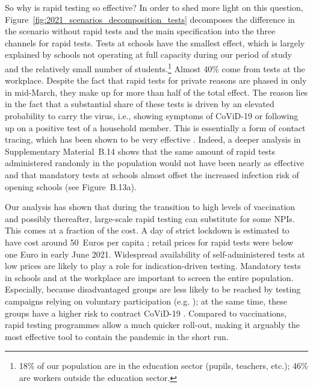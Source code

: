 \documentclass[12pt]{article}
\begin{document}
So why is rapid testing so effective? In order to shed more light on this question,
Figure~\ref{fig:2021_scenarios_decomposition_tests} decomposes the difference in the
scenario without rapid tests and the main specification into the three channels for
rapid tests. Tests at schools have the smallest effect, which is largely explained by
schools not operating at full capacity during our period of study and the relatively
small number of students.\footnote{18\% of our population are in the education sector
(pupils, teachers, etc.); 46\% are workers outside the education sector.} Almost 40\%
come from tests at the workplace. Despite the fact that rapid tests for private reasons
are phased in only in mid-March, they make up for more than half of the total effect.
The reason lies in the fact that a substantial share of these tests is driven by an
elevated probability to carry the virus, i.e., showing symptoms of CoViD-19 or following
up on a positive test of a household member. This is essentially a form of contact
tracing, which has been shown to be very effective \cite{Contreras2021,
Fetzer2021,Kretzschmar2020}. Indeed, a deeper analysis in Supplementary Material~B.14
shows that the same amount of rapid tests administered randomly in the population would
not have been nearly as effective and that mandatory tests at schools almost offset the
increased infection risk of opening schools (see Figure~B.13a).

Our analysis has shown that during the transition to high levels of vaccination and
possibly thereafter, large-scale rapid testing can substitute for some NPIs. This comes
at a fraction of the cost. A day of strict lockdown is estimated to have cost around
50~Euros per capita \cite{Dorn2020b}; retail prices for rapid tests were below one Euro
in early June 2021. Widespread availability of self-administered tests at low prices are
likely to play a role for indication-driven testing. Mandatory tests in schools and at
the workplace are important to screen the entire population. Especially, because
disadvantaged groups are less likely to be reached by testing campaigns relying on
voluntary participation (e.g. \cite{StillmanTonin2021}); at the same time, these groups
have a higher risk to contract CoViD-19 \cite{KochInstitut2021a}. Compared to
vaccinations, rapid testing programmes allow a much quicker roll-out, making it arguably
the most effective tool to contain the pandemic in the short run.




\end{document}
